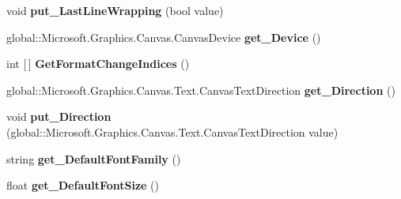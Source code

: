 \begin{DoxyCompactItemize}
\mbox{\label{interface_microsoft_1_1_graphics_1_1_canvas_1_1_text_1_1_i_canvas_text_layout_adeb3fc37708660c2d3ff7a49349a4f43}} 
void {\bfseries put\+\_\+\+Last\+Line\+Wrapping} (bool value)
\item 
\mbox{\label{interface_microsoft_1_1_graphics_1_1_canvas_1_1_text_1_1_i_canvas_text_layout_ac15a95c4a7796e189425d1953df24949}} 
global\+::\+Microsoft.\+Graphics.\+Canvas.\+Canvas\+Device {\bfseries get\+\_\+\+Device} ()
\item 
\mbox{\label{interface_microsoft_1_1_graphics_1_1_canvas_1_1_text_1_1_i_canvas_text_layout_a73f2d2dac663dc66cf5846e351b3ecb5}} 
int \mbox{[}$\,$\mbox{]} {\bfseries Get\+Format\+Change\+Indices} ()
\item 
\mbox{\label{interface_microsoft_1_1_graphics_1_1_canvas_1_1_text_1_1_i_canvas_text_layout_adcf04927cfc8f87ca62aed637107ecc8}} 
global\+::\+Microsoft.\+Graphics.\+Canvas.\+Text.\+Canvas\+Text\+Direction {\bfseries get\+\_\+\+Direction} ()
\item 
\mbox{\label{interface_microsoft_1_1_graphics_1_1_canvas_1_1_text_1_1_i_canvas_text_layout_a7e880bd0b063a9b01869580d1fa1dc3a}} 
void {\bfseries put\+\_\+\+Direction} (global\+::\+Microsoft.\+Graphics.\+Canvas.\+Text.\+Canvas\+Text\+Direction value)
\item 
\mbox{\label{interface_microsoft_1_1_graphics_1_1_canvas_1_1_text_1_1_i_canvas_text_layout_ae9a3d34571d57d80cd0bf928ae229311}} 
string {\bfseries get\+\_\+\+Default\+Font\+Family} ()
\item 
\mbox{\label{interface_microsoft_1_1_graphics_1_1_canvas_1_1_text_1_1_i_canvas_text_layout_a100786b18511c24b2f14c20333076955}} 
float {\bfseries get\+\_\+\+Default\+Font\+Size} ()

\end{DoxyCompactItemize}
